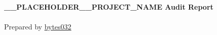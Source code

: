 \newlength{\logoWidth}
\setlength{\logoWidth}{0.6\textwidth}

\begin{titlepage}
  \vbox{}
  \vbox{}

  \begin{center}
  
    \ifdim\pagegoal>\maxdimen
      \vspace*{2cm} %
      \noindent\makebox[\linewidth]{\rule{.7\paperwidth}{.6pt}}\\[0.7cm]
      {\huge \bfseries Summary of Findings}\\
      \noindent\makebox[\linewidth]{\rule{.7\paperwidth}{.6pt}}\\[0.7cm]
      \normalsize %
      
      \texttt{[image: img/project-logo.png]} %
      
      \vfill
      \else
      \vfill
      
      \texttt{[image: img/project-logo.png]} %
      
      \vfill
    \fi

    \noindent\makebox[\linewidth]{\rule{.7\paperwidth}{.6pt}}\\[0.7cm]

    {\huge \bfseries
      __PLACEHOLDER__PROJECT_NAME Audit Report
    }\\[0.25cm]
    
    \noindent\makebox[\linewidth]{\rule{.7\paperwidth}{.6pt}}\\[0.7cm]

    \large
    Prepared by \href{https://bytes032.xyz}{bytes032}

    
    \vfill






    

  \end{center}

\end{titlepage}